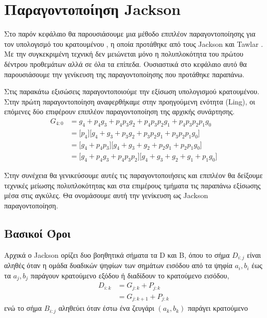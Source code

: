 \section{Παραγοντοποίηση Jackson}

Στο παρόν κεφάλαιο θα παρουσιάσουμε μια μέθοδο επιπλέον παραγοντοποίησης 
για τον υπολογισμό του κρατουμένου , η οποία προτάθηκε από τους Jackson και 
Tawlar \cite{jackson}. Με την συγκεκριμένη τεχνική δεν μειώνεται μόνο
η πολυπλοκότητα του πρώτου δέντρου προθεμάτων αλλά σε όλα τα επίπεδα.
Ουσιαστικά στο κεφάλαιο αυτό θα παρουσιάσουμε την γενίκευση της 
παραγοντοποίησης που προτάθηκε παραπάνω.

Στις παρακάτω εξισώσεις παραγοντοποιούμε την εξίσωση υπολογισμού κρατουμένου.
Στην πρώτη παραγοντοποίηση αναφερθήκαμε στην προηγούμενη ενότητα (Ling),
οι επόμενες δύο επιφέρουν επιπλέον παραγοντοποίηση της αρχικής συνάρτησης. 
\begin{equation}
\begin{split}
    G_{4:0} &= g_4 + p_4    g_3 + p_4p_3g_2 + p_4p_3p_2g_1 + p_4p_3p_2p_1g_0 \\
            &= \Big[p_4\Big]\Big[g_4 + g_3 +p_3g_2 + p_3p_2g_1 + p_3p_2p_1g_0\Big] \\
            &=\Big[g_4 + p_4p_3\Big]\Big[g_4 + g_3 + g_2 + p_2g_1 + p_2p_1g_0\Big] \\
            &= \Big[g_4 +  p_4g_3 + p_4p_3p_2 \Big]\Big[ g_4 + g_3 + g_2 + g_1 + p_1g_0 \Big]
\end{split}
\end{equation}

Στην συνέχεια θα γενικεύσουμε αυτές τις παραγοντοποιήσεις και επιπλέον
θα δείξουμε τεχνικές μείωσης πολυπλοκότητας και στα επιμέρους τμήματα
τις παραπάνω εξίσωσης μέσα στις αγκύλες. Θα ονομάσουμε αυτή την γενίκευση 
ως Jackson παραγοντοποίηση.





\subsection{Βασικοί Όροι}


Αρχικά ο Jackson ορίζει δυο βοηθητικά σήματα τα D και B,
όπου το σήμα $D_{i:j}$ είναι αληθές όταν η ομάδα δυαδικών ψηφίων των 
σημάτων εισόδου από τα ψηφία $a_i,b_i$ έως τα $a_j,b_j$ παράγουν κρατούμενο
εξόδου ή διαδίδουν το κρατούμενο εισόδου,
\begin{equation}
\begin{split}
    D_{i:k} &= G_{j:k} + P_{j:k}\\
            &= G_{j:k+1} + P_{j:k}
\end{split}
\end{equation}
ενώ το σήμα $B_{i:j}$ αληθεύει όταν 
έστω ένα ζευγάρι $(a_k,b_k)$ παράγει κρατούμενο


